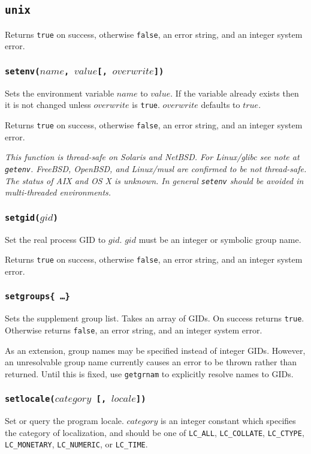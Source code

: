 \documentclass[11pt, oneside]{memoir}
\newcommand*{\true}[0]{\texttt{true}\xspace}
\newcommand*{\false}[0]{\texttt{false}\xspace}
\newcommand*{\fn}[1]{\texttt{#1}\xspace}
\newcounter{toccols}
\newenvironment{Module}[1]{
	\subsection{\texttt{#1}}
	\addtocontents{toc}{
		\protect\begin{multicols}{\value{toccols}}
	}
}{
	\addtocontents{toc}{\protect\end{multicols}}
}
\begin{document}
\begin{Module}{unix}
Returns \true on success, otherwise \false, an error string, and an integer system error.

\subsubsection[\fn{setenv}]{\fn{setenv($name$, $value$[, $overwrite$])}}

Sets the environment variable $name$ to $value$. If the variable already exists then it is not changed unless $overwrite$ is \true. $overwrite$ defaults to $true$.

Returns \true on success, otherwise \false, an error string, and an integer system error.

\emph{This function is thread-safe on Solaris and NetBSD. For Linux/glibc see note at \fn{getenv}. FreeBSD, OpenBSD, and Linux/musl are confirmed to be not thread-safe. The status of AIX and OS X is unknown. In general \fn{setenv} should be avoided in multi-threaded environments.}

\subsubsection[\fn{setgid}]{\fn{setgid($gid$)}}

Set the real process GID to $gid$. $gid$ must be an integer or symbolic group name.

Returns \true on success, otherwise \false, an error string, and an integer system error.

\subsubsection[\fn{setgroups}]{\fn{setgroups\{ \ldots \}}}

Sets the supplement group list. Takes an array of GIDs. On success returns \true. Otherwise returns \false, an error string, and an integer system error.

As an extension, group names may be specified instead of integer GIDs. However, an unresolvable group name currently causes an error to be thrown rather than returned. Until this is fixed, use \fn{getgrnam} to explicitly resolve names to GIDs.

\subsubsection[\fn{setlocale}]{\fn{setlocale($category$ [, $locale$])}}

Set or query the program locale. $category$ is an integer constant which specifies the category of localization, and should be one of \texttt{LC\_ALL}, \texttt{LC\_COLLATE}, \texttt{LC\_CTYPE}, \texttt{LC\_MONETARY}, \texttt{LC\_NUMERIC}, or \texttt{LC\_TIME}.


\end{Module}
\end{document}
